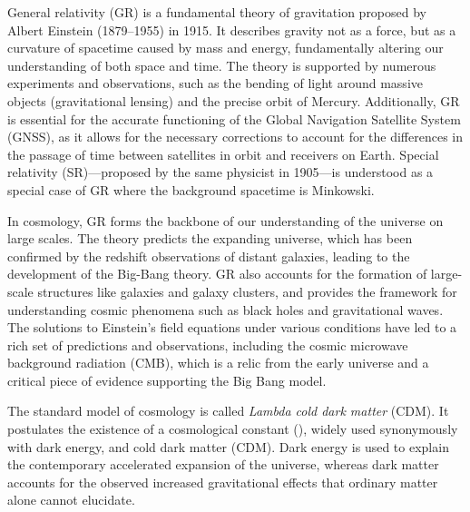 






General relativity (GR) is a fundamental theory of gravitation proposed by Albert Einstein (1879--1955) in 1915. It describes gravity not as a force, but as a curvature of spacetime caused by mass and energy, fundamentally altering our understanding of both space and time. The theory is supported by numerous experiments and observations, such as the bending of light around massive objects (gravitational lensing) and the precise orbit of Mercury. Additionally, GR is essential for the accurate functioning of the Global Navigation Satellite System (GNSS), as it allows for the necessary corrections to account for the differences in the passage of time between satellites in orbit and receivers on Earth.
%
Special relativity (SR)---proposed by the same physicist in 1905---is understood as a special case of GR where the background spacetime is Minkowski. 
%


In cosmology, GR forms the backbone of our understanding of the universe on large scales. The theory predicts the expanding universe, which has been confirmed by the redshift observations of distant galaxies, leading to the development of the Big-Bang theory. GR also accounts for the formation of large-scale structures like galaxies and galaxy clusters, and provides the framework for understanding cosmic phenomena such as black holes and gravitational waves. The solutions to Einstein's field equations under various conditions have led to a rich set of predictions and observations, including the cosmic microwave background radiation (CMB), which is a relic from the early universe and a critical piece of evidence supporting the Big Bang model.



The standard model of cosmology is called \textit{Lambda cold dark matter} (\textLambda{}CDM). It postulates the existence of a cosmological constant (\textLambda{}), widely used synonymously with dark energy, and cold dark matter (CDM). %
Dark energy is used to explain the contemporary accelerated expansion of the universe, whereas dark matter accounts for the observed increased gravitational effects that ordinary matter alone cannot elucidate. %


